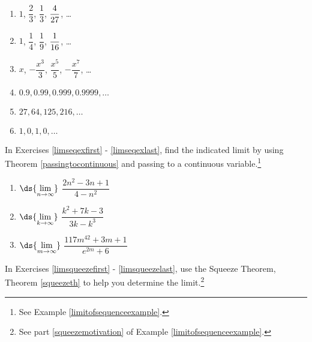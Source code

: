 \documentclass{ximera}
\begin{document}
\begin{multicols}{3}
\begin{enumerate}
\setcounter{enumi}{\value{HW}}

\item $1$, $\dfrac{2}{3}$, $\dfrac{1}{3}$, $\dfrac{4}{27} \vphantom{\dfrac{x^7}{7}}$, \ldots
\item $1$, $\dfrac{1}{4}$, $\dfrac{1}{9}$, $\dfrac{1}{16} \vphantom{-\dfrac{x^7}{7}}$, \ldots
\item $x$, $-\dfrac{x^3}{3}$, $\dfrac{x^5}{5}$, $-\dfrac{x^7}{7}$, \ldots

\item $0.9, 0.99, 0.999, 0.9999, \ldots$
\item $27, 64, 125, 216, \ldots$
\item $1, 0, 1, 0, \ldots$ \label{nthtermlast}

\setcounter{HW}{\value{enumi}}
\end{enumerate}
\end{multicols}



In Exercises \ref{limseqexfirst} - \ref{limseqexlast}, find the indicated limit by using Theorem \ref{passingtocontinuous} and passing to a continuous variable.\footnote{See Example \ref{limitofsequenceexample}.}


\begin{multicols}{3}
\begin{enumerate}
\setcounter{enumi}{\value{HW}}

\item\label{limseqexfirst}  $\ds{\lim_{n \rightarrow \infty}}$ $\dfrac{2n^2 - 3n+1}{4-n^2}$

\item  $\ds{\lim_{k \rightarrow \infty}}$ $\dfrac{k^2 +7k-3}{3k - k^3}$

\item\label{limseqexlast}  $\ds{\lim_{m \rightarrow \infty}}$ $\dfrac{117m^{42} + 3m + 1}{e^{2m} + 6}$

\setcounter{HW}{\value{enumi}}
\end{enumerate}
\end{multicols}


In Exercises \ref{limsqueezefirst} - \ref{limsqueezelast}, use the Squeeze Theorem,  Theorem \ref{squeezeth} to help you determine the limit.\footnote{See part \ref{squeezemotivation} of Example \ref{limitofsequenceexample}.}
\end{document}
